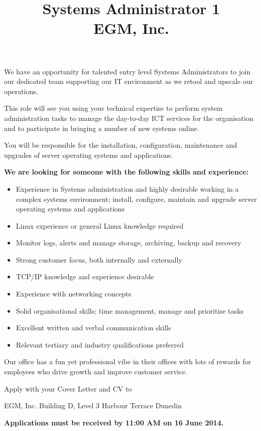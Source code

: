 \documentclass{article}   	%
\title{Systems Administrator 1\\EGM, Inc.}
\begin{document}
\maketitle
We have an opportunity for talented entry level  Systems Administrators to join our dedicated team supporting our IT environment as we retool and upscale our operations.
 
This role will see you using your technical expertise to perform system administration tasks to manage the day-to-day ICT services for the organisation and to participate in bringing a number of new systems online.
 
You will be responsible for the installation, configuration, maintenance and upgrades of server operating systems and applications.
 

\textbf{We are looking for someone with the following skills and experience:}
\begin{itemize}
\item Experience in Systems administration and highly desirable working in a complex systems environment; install, configure, maintain and upgrade server operating systems and applications
\item Linux experience or general Linux knowledge required
\item Monitor logs, alerts and manage storage, archiving, backup and recovery
\item Strong customer focus, both internally and externally  
\item TCP/IP knowledge and experience desirable
\item Experience with networking concepts
\item Solid organisational skills; time management, manage and prioritise tasks
\item Excellent written and verbal communication skills
\item Relevant tertiary and industry qualifications preferred
\end{itemize}

Our office has a fun yet professional vibe in their offices with lots of rewards for employees who drive growth and improve customer service.
 
Apply with your Cover Letter and CV to


EGM, Inc.
Building D, Level 3
Harbour Terrace
Dunedin

\textbf{Applications must be received by 11:00 AM on 16 June 2014.}
\end{document}
